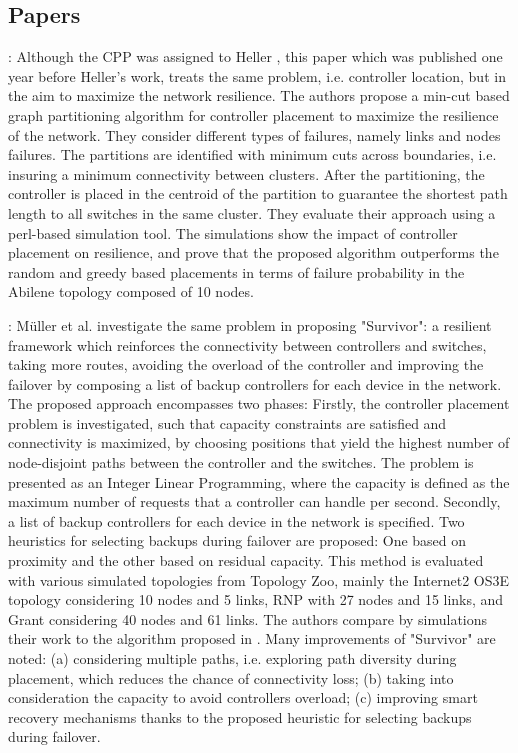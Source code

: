 \documentclass[a4paper,10pt]{article}
\begin{document}
\subsection{Papers}
\cite{ZhBe11}: Although the CPP was assigned to Heller \cite{HeSh12}, this paper which was published one year before Heller's work, treats the same problem, i.e. controller location, but in the aim to maximize the network resilience. The authors propose a min-cut based graph partitioning algorithm for controller placement to maximize the resilience of the network. They consider different types of failures, namely links and nodes failures. The partitions are identified with minimum cuts across boundaries, i.e. insuring a minimum connectivity between clusters. After the partitioning, the controller is placed in the centroid of the partition to guarantee the shortest path length to all switches in the same cluster. They evaluate their approach using a perl-based simulation tool. The simulations show the impact of controller placement on resilience, and prove that the proposed algorithm outperforms the random and greedy based placements in terms of failure probability in the Abilene topology composed of 10 nodes. 


\cite{MuOl14}: Müller et al. investigate the same problem in \cite{ZhBe11} proposing "Survivor": a resilient framework which reinforces the connectivity between controllers and switches, taking more routes, avoiding the overload of the controller and improving the failover by composing a list of backup controllers for each device in the network. The proposed approach encompasses two phases: Firstly, the controller placement problem is investigated, such that capacity constraints are satisfied and connectivity is maximized, by choosing positions that yield the highest number of node-disjoint paths between the controller and the switches. The problem is presented as an Integer Linear Programming, where the capacity is defined as the maximum number of requests that a controller can handle per second. Secondly, a list of backup controllers for each device in the network is specified. Two heuristics for selecting backups during failover are proposed: One based on proximity and the other based on residual capacity. This method is evaluated with various simulated topologies from Topology Zoo, mainly the Internet2 OS3E topology considering 10 nodes and 5 links, RNP with 27 nodes and 15 links, and Grant considering 40 nodes and 61 links.   The authors compare by simulations their work to the algorithm proposed in \cite{ZhBe11}. Many improvements of "Survivor" are noted: (a) considering multiple paths, i.e. exploring path diversity during placement, which reduces the chance of connectivity loss; (b) taking into consideration the capacity to avoid controllers overload; (c) improving smart recovery mechanisms thanks to the proposed heuristic for selecting backups during failover.
\end{document}

